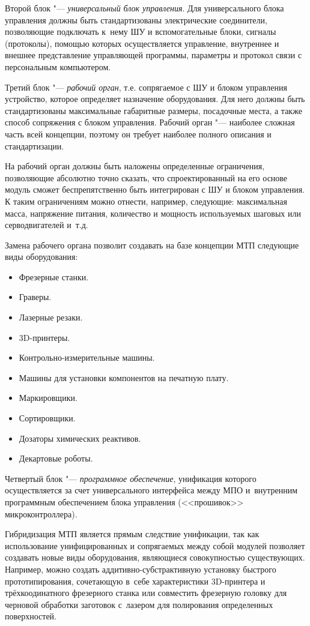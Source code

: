 Второй блок "--- \textit{универсальный} \textit{блок управления}. Для универсального блока управления должны быть стандартизованы электрические соединители, позволяющие подключать к~нему ШУ и вспомогательные блоки, сигналы (протоколы), помощью которых осуществляется управление, внутреннее и внешнее представление управляющей программы, параметры и протокол связи с персональным компьютером.

Третий блок "--- \textit{рабочий орган}, т.е. сопрягаемое с ШУ и блоком управления устройство, которое определяет назначение оборудования. Для него должны быть стандартизованы максимальные габаритные размеры, посадочные места, а также способ сопряжения с блоком управления. Рабочий орган "--- наиболее сложная часть всей концепции, поэтому он требует наиболее полного описания и стандартизации.

На рабочий орган должны быть наложены определенные ограничения, позволяющие абсолютно точно сказать, что спроектированный на его основе модуль сможет беспрепятственно быть интегрирован с ШУ и блоком управления. К таким ограничениям можно отнести, например, следующие: максимальная масса, напряжение питания, количество и мощность используемых шаговых или серводвигателей и~т.\:д.

Замена рабочего органа позволит создавать на базе концепции \foreignlanguage{english}{МТП} следующие виды оборудования:

\begin{itemize}
	\item Фрезерные станки.
	\item Граверы.
	\item Лазерные резаки.
	\item 3D-принтеры.
	\item Контрольно-измерительные машины.
	\item Машины для установки компонентов на печатную плату.
	\item Маркировщики.
	\item Сортировщики.
	\item Дозаторы химических реактивов.
	\item Декартовые роботы.
\end{itemize}

Четвертый блок "--- \textit{программное обеспечение}, унификация которого осуществляется за счет универсального интерфейса между МПО и~внутренним программным обеспечением блока управления (<<прошивок>> микроконтроллера).

Гибридизация МТП является прямым следствие унификации, так как использование унифицированных и сопрягаемых между собой модулей позволяет создавать новые виды оборудования, являющиеся совокупностью существующих. Например, можно создать аддитивно-субстрактивную установку быстрого прототипирования, сочетающую в~себе характеристики 3D-принтера и трёхкоодинатного фрезерного станка или совместить фрезерную головку для черновой обработки заготовок с~лазером для полирования определенных поверхностей.

